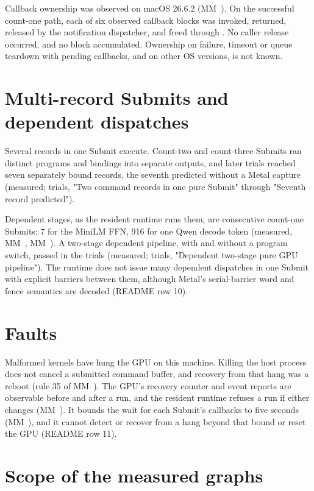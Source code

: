Callback ownership was observed on macOS 26.6.2 (MM~). On the successful count-one path, each of six
observed callback blocks was invoked, returned, released by the notification dispatcher, and freed through
. No caller release occurred, and no block accumulated. Ownership on failure, timeout or
queue teardown with pending callbacks, and on other OS versions, is not known.

\section{Multi-record Submits and dependent dispatches}\label{sec:several-records-per}

Several records in one Submit execute. Count-two and count-three Submits ran distinct programs and bindings into
separate outputs, and later trials reached seven separately bound records, the seventh predicted without a Metal
capture (measured; trials, "Two command records in one pure Submit" through "Seventh record predicted").

Dependent stages, as the resident runtime runs them, are consecutive count-one Submits: 7 for the MiniLM FFN, 916 for
one Qwen decode token (measured, MM~, MM~). A two-stage dependent pipeline, with and without
a program switch, passed in the trials (measured; trials, "Dependent two-stage pure GPU pipeline"). The runtime does
not issue many dependent dispatches in one Submit with explicit barriers between them, although Metal's
serial-barrier word and fence semantics are decoded (README row 10).

\section{Faults}\label{sec:faults-hangs-recovery}

Malformed kernels have hung the GPU on this machine. Killing the host process does not cancel a submitted command
buffer, and recovery from that hang was a reboot (rule 35 of MM~). The GPU's recovery counter and event reports
are observable before and after a run, and the resident runtime refuses a run if either changes (MM~). It
bounds the wait for each Submit's callbacks to five seconds (MM~), and it cannot detect or recover from a
hang beyond that bound or reset the GPU (README row 11).

\section{Scope of the measured graphs}\label{sec:measured-graphs-generalizes}


